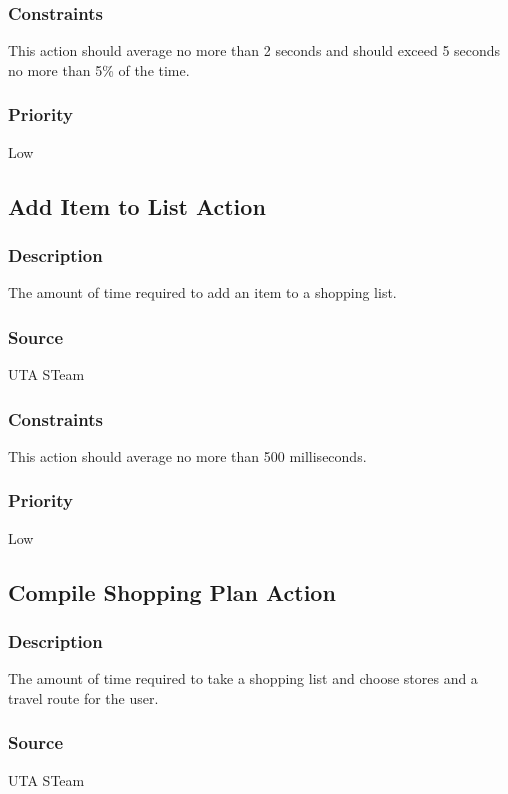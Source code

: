\subsubsection{Constraints}
This action should average no more than 2 seconds and should exceed 5 seconds no more than 5\% of the time.
\subsubsection{Priority}
Low

\subsection{Add Item to List Action}
\subsubsection{Description}
The amount of time required to add an item to a shopping list.
\subsubsection{Source}
UTA STeam
\subsubsection{Constraints}
This action should average no more than 500 milliseconds.
\subsubsection{Priority}
Low

\subsection{Compile Shopping Plan Action}
\subsubsection{Description}
The amount of time required to take a shopping list and choose stores and a travel route for the user.
\subsubsection{Source}
UTA STeam

